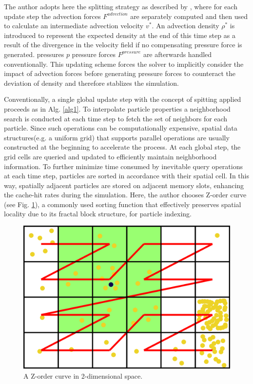 \documentclass[
	11pt, 
	DIV10,
	ngerman,
	a4paper, 
	oneside, 
	headings=normal, 
	captions=tableheading,
	final, 
	numbers=noenddot
]{scrartcl}
\begin{document}
The author adopts here the splitting strategy as described by \cite{ihmsen2014sph}, where for each update step the advection forces $ F^{advection} $ are separately computed and then used to calculate an intermediate advection velocity $ v^{*} $. An advection density $ \rho^{*} $ is introduced to represent the expected density at the end of this time step as a result of the divergence in the velocity field if no compensating pressure force is generated. pressures $ p $ pressure forces $ F^{pressure} $ are afterwards handled conventionally. This updating scheme forces the solver to implicitly consider the impact of advection forces before generating pressure forces to counteract the deviation of density and therefore stablizes the simulation.
\par
Conventionally, a single global update step with the concept of spitting applied proceeds as in Alg. \ref{alg1}. To interpolate particle properties a neighborhood search is conducted at each time step to fetch the set of neighbors for each particle. Since such operations can be computationally expensive, spatial data
structures(e.g. a uniform grid) that supports parallel operations are usually constructed at the beginning to accelerate the process. At each global step, the grid cells are queried and updated to efficiently maintain neighborhood information. To further minimize time consumed by inevitable query operations at each time step, particles are sorted in accordance with their spatial cell. In this way, spatially adjacent particles are stored on adjacent memory slots, enhancing the cache-hit rates during the simulation. Here, the author chooses Z-order curve (see Fig. \ref{fig6}), a commonly used sorting function that effectively preserves spatial locality due to its fractal block structure, for particle indexing.

\begin{figure}[tb]
	\centering
	\includegraphics[scale=0.075]{images/7}
	\caption{\label{fig6} A Z-order curve in 2-dimensional space.}
\end{figure}
\end{document}
